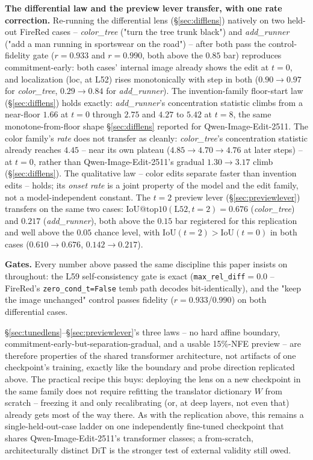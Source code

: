 \documentclass[10pt,twocolumn]{article}
\newcommand{\model}{Qwen-Image-Edit-2511}
\begin{document}
\textbf{The differential law and the preview lever transfer, with one
rate correction.} Re-running the differential lens
(\S\ref{sec:difflens}) natively on two held-out FireRed cases --
\emph{color\_tree} ("turn the tree trunk black") and \emph{add\_runner}
("add a man running in sportswear on the road") -- after both pass the
control-fidelity gate ($r=0.933$ and $r=0.990$, both above the $0.85$
bar) reproduces commitment-early: both cases' internal image already
shows the edit at $t{=}0$, and localization (loc, at L52) rises
monotonically with step in both ($0.90\to0.97$ for \emph{color\_tree},
$0.29\to0.84$ for \emph{add\_runner}). The invention-family
floor-start law (\S\ref{sec:difflens}) holds exactly:
\emph{add\_runner}'s concentration statistic climbs from a near-floor
$1.66$ at $t{=}0$ through $2.75$ and $4.27$ to $5.42$ at $t{=}8$, the
same monotone-from-floor shape \S\ref{sec:difflens} reported for
\model{}. The color family's \emph{rate} does not transfer as cleanly:
\emph{color\_tree}'s concentration statistic already reaches $4.45$ --
near its own plateau ($4.85\to4.70\to4.76$ at later steps) -- at
$t{=}0$, rather than \model{}'s gradual $1.30\to3.17$ climb
(\S\ref{sec:difflens}). The qualitative law -- color edits separate
faster than invention edits -- holds; its \emph{onset rate} is a joint
property of the model and the edit family, not a model-independent
constant. The $t{=}2$ preview lever (\S\ref{sec:previewlever})
transfers on the same two cases: $\mathrm{IoU@top10}(\text{L52},
t{=}2) = 0.676$ (\emph{color\_tree}) and $0.217$ (\emph{add\_runner}),
both above the $0.15$ bar registered for this replication and well
above the $0.05$ chance level, with $\mathrm{IoU}(t{=}2) >
\mathrm{IoU}(t{=}0)$ in both cases ($0.610\to0.676$,
$0.142\to0.217$).

\textbf{Gates.} Every number above passed the same discipline this
paper insists on throughout: the L59 self-consistency gate is exact
(\texttt{max\_rel\_diff}$=0.0$ -- FireRed's \texttt{zero\_cond\_t=False}
temb path decodes bit-identically), and the "keep the image unchanged"
control passes fidelity ($r=0.933$/$0.990$) on both differential cases.

\S\ref{sec:tunedlens}--\S\ref{sec:previewlever}'s three laws -- no hard
affine boundary, commitment-early-but-separation-gradual, and a usable
15\%-NFE preview -- are therefore properties of the shared transformer
architecture, not artifacts of one checkpoint's training, exactly like
the boundary and probe direction replicated above. The practical
recipe this buys: deploying the lens on a new checkpoint in the same
family does not require refitting the translator dictionary $W$ from
scratch -- freezing it and only recalibrating (or, at deep layers, not
even that) already gets most of the way there. As with the replication
above, this remains a single-held-out-case ladder on one independently
fine-tuned checkpoint that shares \model{}'s transformer classes; a
from-scratch, architecturally distinct DiT is the stronger test of
external validity still owed.
\end{document}
